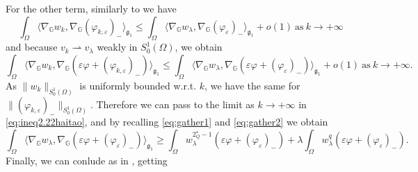 \documentclass[11pt]{amsart}
\numberwithin{equation}{section} %
\theoremstyle{definition}
\def\G{\mathbb{G}}
\newcommand{\m}{\mbox}
\begin{document}
For the other term, similarly to  \cite[Lemma 3.4]{BadTar}
we have
\[
\int_\Omega \langle \nabla_\G w_k,\nabla_\G (\varphi_{k,\varepsilon})_-\rangle_{\mathfrak{g}_{1}}\leq
\int_\Omega\langle \nabla_\G{w_\lambda},\nabla_\G(\varphi_{\varepsilon})_-\rangle_{\mathfrak{g}_{1}} +o(1)\ \m{as}\ k\to+\infty
\]
and because $v_k\rightharpoonup v_\lambda$  weakly in $S_0^1(\Omega)$, we obtain
\begin{equation}\label{eq:gather2}
	\int_\Omega\langle \nabla_\G w_k,\nabla_\G(\varepsilon\varphi+(\varphi_{k,\varepsilon})_-)\rangle_{\mathfrak{g}_{1}}
	\leq \int_\Omega\langle \nabla_\G {w_\lambda},\nabla_\G(\varepsilon\varphi+(\varphi_{\varepsilon})_-)\rangle_{\mathfrak{g}_{1}} +o(1)\ \m{as}\ k\to+\infty.
\end{equation}
As $\|w_k\|_{S^1_0(\Omega)}$ is uniformly bounded
w.r.t. $k$, we have the same
for $\|(\varphi_{k,\varepsilon})_-\|_{S^1_0(\Omega)}$.
Therefore we can pass to the limit as $k\to+\infty$
 in \eqref{eq:ineq2.22haitao}, 
and by recalling \eqref{eq:gather1} and \eqref{eq:gather2}  we obtain
\begin{equation}
	\int_\Omega\langle \nabla_\G w_\lambda,\nabla_\G(\varepsilon\varphi+(\varphi_\varepsilon)_-)\rangle_{\mathfrak{g}_1}\geq
	\int_\Omega w_\lambda^{2^\star_Q-1}(\varepsilon\varphi+(\varphi_\varepsilon)_-)+
	\lambda\int_\Omega w_\lambda^{q}(\varepsilon\varphi+(\varphi_\varepsilon)_-).
\end{equation}
Finally, we can conlude as in \cite[Lemma 4.1]{BiGaVe}, getting
\end{document}
